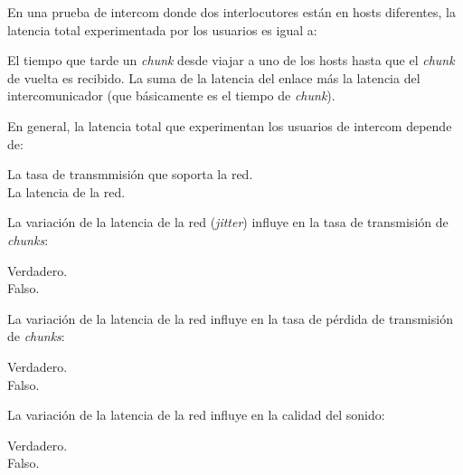 \documentclass[legalpaper, 12pt, addpoints]{exam}
\begin{document}
\begin{questions}
\vspace{0.10in}

\question En una prueba de intercom donde dos interlocutores están en hosts diferentes, la latencia total experimentada por los usuarios es igual a:

\begin{oneparchoices}
  \choice El tiempo que tarde un \emph{chunk} desde viajar a uno de los hosts hasta que el \emph{chunk} de vuelta es recibido.
  \choice La suma de la latencia del enlace más la latencia del intercomunicador (que básicamente es el tiempo de \emph{chunk}).\\
\end{oneparchoices}
  
\vspace{0.10in}

\question En general, la latencia total que experimentan los usuarios de intercom depende de:

\begin{oneparchoices}
  \choice La tasa de transmmisión que soporta la red.\\
  \choice La latencia de la red.
\end{oneparchoices}
  
\vspace{0.10in}

\question La variación de la latencia de la red (\emph{jitter}) influye en la tasa de transmisión de \emph{chunks}:

\begin{oneparchoices}
  \choice Verdadero.\\
  \choice Falso.
\end{oneparchoices}
  
\vspace{0.10in}

\question La variación de la latencia de la red influye en la tasa de pérdida de transmisión de \emph{chunks}:

\begin{oneparchoices}
  \choice Verdadero.\\
  \choice Falso.
\end{oneparchoices}
  
\vspace{0.10in}

\question La variación de la latencia de la red influye en la calidad del sonido:

\begin{oneparchoices}
  \choice Verdadero.\\
  \choice Falso.
\end{oneparchoices}
  

\end{questions}
\end{document}
